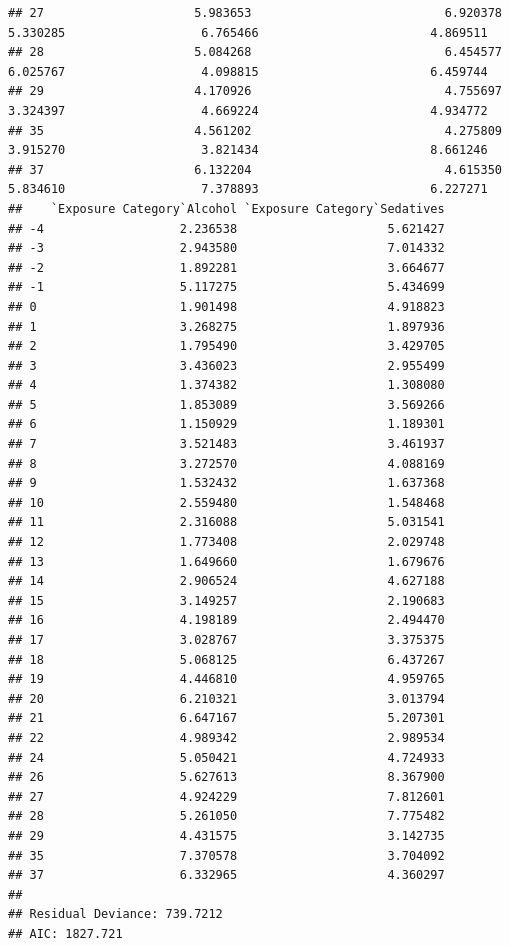 \documentclass[
]{article}
\begin{document}
\begin{verbatim}
## 27                     5.983653                           6.920378                      5.330285                   6.765466                        4.869511
## 28                     5.084268                           6.454577                      6.025767                   4.098815                        6.459744
## 29                     4.170926                           4.755697                      3.324397                   4.669224                        4.934772
## 35                     4.561202                           4.275809                      3.915270                   3.821434                        8.661246
## 37                     6.132204                           4.615350                      5.834610                   7.378893                        6.227271
##    `Exposure Category`Alcohol `Exposure Category`Sedatives
## -4                   2.236538                     5.621427
## -3                   2.943580                     7.014332
## -2                   1.892281                     3.664677
## -1                   5.117275                     5.434699
## 0                    1.901498                     4.918823
## 1                    3.268275                     1.897936
## 2                    1.795490                     3.429705
## 3                    3.436023                     2.955499
## 4                    1.374382                     1.308080
## 5                    1.853089                     3.569266
## 6                    1.150929                     1.189301
## 7                    3.521483                     3.461937
## 8                    3.272570                     4.088169
## 9                    1.532432                     1.637368
## 10                   2.559480                     1.548468
## 11                   2.316088                     5.031541
## 12                   1.773408                     2.029748
## 13                   1.649660                     1.679676
## 14                   2.906524                     4.627188
## 15                   3.149257                     2.190683
## 16                   4.198189                     2.494470
## 17                   3.028767                     3.375375
## 18                   5.068125                     6.437267
## 19                   4.446810                     4.959765
## 20                   6.210321                     3.013794
## 21                   6.647167                     5.207301
## 22                   4.989342                     2.989534
## 24                   5.050421                     4.724933
## 26                   5.627613                     8.367900
## 27                   4.924229                     7.812601
## 28                   5.261050                     7.775482
## 29                   4.431575                     3.142735
## 35                   7.370578                     3.704092
## 37                   6.332965                     4.360297
## 
## Residual Deviance: 739.7212 
## AIC: 1827.721
\end{verbatim}
\end{document}

